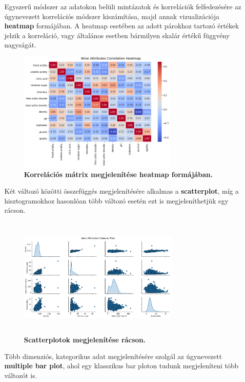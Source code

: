 \documentclass[12pt]{article}
\theoremstyle{plain}
\begin{document}
 Egyszerű módszer az adatokon belüli mintázatok és korrelációk felfedezésére az úgynevezett korrelációs módszer kiszámítása, majd annak vizualizációja \textbf{heatmap} formájában. A heatmap esetében az adott párokhoz tartozó értékek jelzik a korreláció, vagy általános esetben bármilyen skalár értékű függvény nagyságát.
 
 \begin{figure}[H]
    \centering
    \includegraphics[width=8cm, height=6cm]{media/kormap.png}
    \caption{\textbf{Korrelációs mátrix megjelenítése heatmap formájában.}}
    \label{fig:GeneralDiagram}
 \end{figure}
 
 Két változó közötti összefüggés megjelenítésére alkalmas a \textbf{scatterplot}, míg a hisztogramokhoz hasonlóan több változó esetén ezt is megjeleníthetjük egy rácson.
 
 \begin{figure}[H]
    \centering
    \includegraphics[width=8cm, height=6cm]{media/pariwise.png}
    \caption{\textbf{Scatterplotok megjelenítése rácson.}}
    \label{fig:GeneralDiagram}
 \end{figure}
 
Több dimenziós, kategorikus adat megjelenítésére szolgál az úgynevezett \textbf{multiple bar plot}, ahol egy klasszikus bar ploton tudunk megjeleníteni több változót is.
\end{document}
